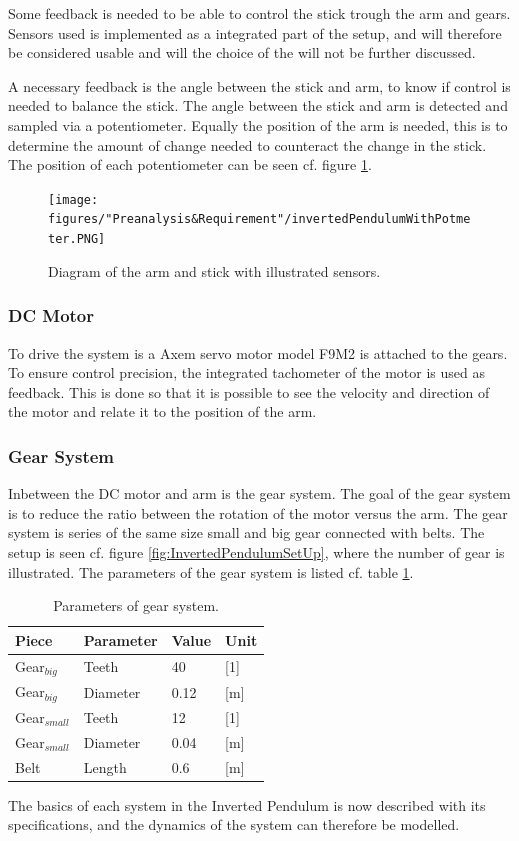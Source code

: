 Some feedback is needed to be able to control the stick trough the arm and gears. Sensors used is implemented as a integrated part of the setup, and will therefore be considered usable and will the choice of the will not be further discussed.

A necessary feedback is the angle between the stick and arm, to know if control is needed to balance the stick. The angle between the stick and arm is detected and sampled via a potentiometer. Equally the position of the arm is needed, this is to determine the amount of change needed to counteract the change in the stick. The position of each potentiometer can be seen cf. figure \ref{fig:InvertedPendulumSetUpPotmeter}. 

\begin{figure} [htbp]
	\centering
	\texttt{[image: figures/"Preanalysis\&Requirement"/invertedPendulumWithPotmeter.PNG]}
	\caption{Diagram of the arm and stick with illustrated sensors.} \label{fig:InvertedPendulumSetUpPotmeter}
\end{figure}



\subsubsection{DC Motor}
To drive the system is a Axem servo motor model F9M2 is attached to the gears. To ensure control precision, the integrated tachometer of the motor is used as feedback. This is done so that it is possible to see the velocity and direction of the motor and relate it to the position of the arm.

	

\subsubsection{Gear System}
Inbetween the DC motor and arm is the gear system. The goal of the gear system is to reduce the ratio between the rotation of the motor versus the arm. The gear system is series of the same size small and big gear connected with belts. The setup is seen cf. figure \ref{fig:InvertedPendulumSetUp}, where the number of gear is illustrated. The parameters of the gear system is listed cf. table \ref{GearSystemParameters}.   

\begin{table}[htbp]
\centering
\begin{tabular}{llll}
\hline
Piece & Parameter & Value & Unit \\ \hline
Gear$_{big}$ & Teeth & 40 & {[}1{]} \\
Gear$_{big}$ & Diameter & 0.12 & {[}m{]} \\
Gear$_{small}$ & Teeth & 12 & {[}1{]} \\
Gear$_{small}$ & Diameter & 0.04 & {[}m{]} \\
Belt & Length & 0.6 & {[}m{]}
\end{tabular}
\caption{Parameters of gear system.}
\label{GearSystemParameters}
\end{table}

The basics of each system in the Inverted Pendulum is now described with its specifications, and the dynamics of the system can therefore be modelled.